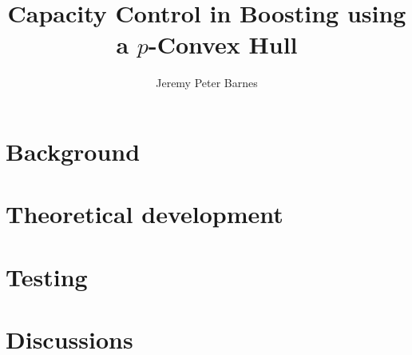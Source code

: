 \documentclass[a4paper,11pt,oneside]{book}
\title{Capacity Control in Boosting using a $p$-Convex Hull}
\author{Jeremy Peter Barnes}
\begin{document}
\frontmatter

\maketitle
\tableofcontents
\listoffigures
\listoftables

\renewcommand{\baselinestretch}{1.2}




\mainmatter



\part{Background}




\part{Theoretical development}



\part{Testing}



\part{Discussions}





\appendix

\renewcommand{\baselinestretch}{1.0}







\backmatter



\end{document}
